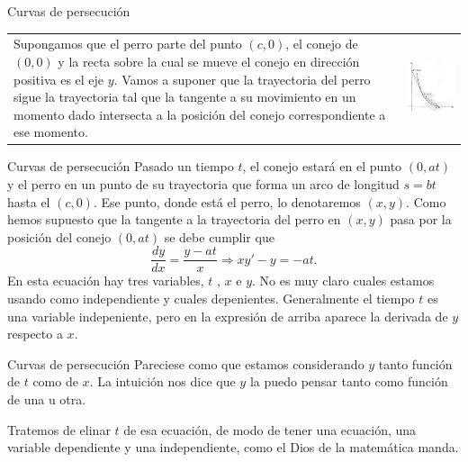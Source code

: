 \documentclass{article}
\begin{document}
{Curvas de persecución}
 \begin{tabular}{m{4.5cm} m{5cm}}
Supongamos que el perro parte del punto $(c,0)$, el conejo de $(0,0 )$ y la recta sobre la cual se mueve el conejo en dirección positiva  es el eje $y$. 
Vamos a suponer que la trayectoria del perro sigue la trayectoria tal que 
la tangente a su movimiento en un momento dado intersecta a la posición del conejo correspondiente a ese momento.
& \includegraphics[scale=.4]{imagenes/persecucion.jpg}
\end{tabular}



{Curvas de persecución}
Pasado un tiempo $t$, el conejo estará en el punto $(0,at)$ y el perro en un punto de su trayectoria que forma un arco de
 longitud $s=bt$ hasta el $(c,0)$. Ese punto, donde está el perro, lo denotaremos $(x,y)$. Como hemos supuesto que la tangente a la trayectoria del perro en $(x,y)$ pasa 
 por la posición del conejo $(0,at)$ se debe cumplir que
 \begin{equation}\label{eq:persec}\frac{dy}{dx}=\frac{y-at}{x}\Longrightarrow xy'-y=-at.\end{equation}
 En esta ecuación hay tres variables, $t$ , $x$ e $y$. No es muy claro cuales estamos usando como independiente y cuales depenientes. 
 Generalmente el tiempo $t$ es una variable  indepeniente, pero en la expresión de arriba aparece la derivada de $y$ respecto a $x$. 


{Curvas de persecución}
  Pareciese como 
 que estamos considerando   $y$ tanto función de $t$ como de $x$. La intuición nos dice que $y$ la puedo pensar tanto como función de una u otra.
 
 Tratemos de elinar $t$ de esa ecuación, de modo de tener una ecuación, una variable dependiente y una independiente, como el Dios de la matemática manda.
 
\end{document}
